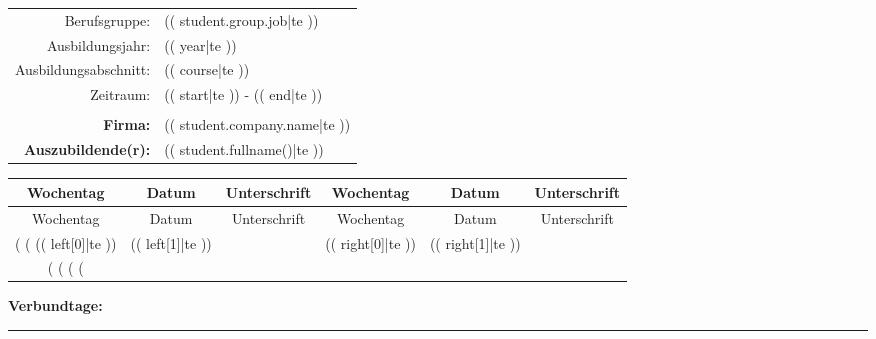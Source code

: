 \documentclass[a4paper]{scrartcl}
\begin{document}
\begin{table}
	\centering
	\begin{tabular}{rl}
	Berufsgruppe: & (( student.group.job|te ))\\
    Ausbildungsjahr: & (( year|te ))\\
	Ausbildungsabschnitt: & (( course|te ))\\
    Zeitraum: & (( start|te )) - (( end|te ))\\
	& \\
	\textbf{Firma:} & (( student.company.name|te ))\\
    \textbf{Auszubildende(r):} & (( student.fullname()|te ))\\
	\end{tabular}
\end{table}

\Large
\centering

\begin{longtable}{cccccc}
	Wochentag & Datum & Unterschrift & Wochentag & Datum & Unterschrift\\
	\hline
	\endfirsthead
	Wochentag & Datum & Unterschrift & Wochentag & Datum & Unterschrift\\
	\hline
	\endhead
    (%
        (%
        (( left[0]|te )) & (( left[1]|te )) & & (( right[0]|te ))& (( right[1]|te )) & \\
        \cline{3-3}\cline{6-6}
    	(%
        (%
        \pagebreak
        (%
    (%
\end{longtable}
\vspace{0.5cm}
\textbf{Verbundtage:} \rule{2cm}{0.4pt}
\end{document}
